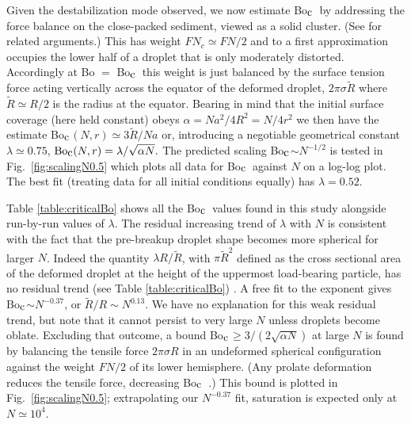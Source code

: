 \documentclass[aps,prl,superscriptaddress,twocolumn,showpacs,floatfix]{revtex4-1}
\newcommand{\Boc}{Bo$_{\hbox{\rm c}}$~}
\newcommand{\Bocm}{Bo$_{\hbox{\rm c}}$}
\begin{document}
Given the destabilization mode observed, we now estimate \Boc by addressing the force balance on the close-packed sediment, viewed as a solid cluster. (See \cite{Oettel,Stone} for related arguments.) This has weight $FN_c\simeq FN/2$ and to a first approximation occupies the lower half of a droplet that is only moderately distorted. Accordingly at Bo $=$ \Boc this weight is just balanced by the surface tension force acting vertically across the equator of the deformed droplet, $2\pi\sigma \tilde R$ where $\tilde R \simeq R/2$ is the radius at the equator. Bearing in mind that the initial surface coverage (here held constant) obeys $\alpha = Na^2/4R^2 = N/4r^2$ we then have the estimate \Bocm $(N,r) \simeq 3\tilde R/Na$ or, introducing a negotiable geometrical constant $\lambda \simeq 0.75$,
$
{\rm Bo}_{\hbox{\rm c}}(N,r)  = {\lambda}/{\sqrt{\alpha N}}.
$
The predicted scaling \Bocm $\sim N^{-1/2}$ is tested in Fig.~\ref{fig:scalingN0.5} which plots all data for \Boc against $N$ on a log-log plot. The best fit (treating data for all initial conditions equally)  has $\lambda = 0.52$. 

Table \ref{table:criticalBo} shows all the \Boc values found in this study alongside run-by-run values of $\lambda$. The residual increasing trend of $\lambda$ with $N$ is consistent with the fact that the pre-breakup droplet shape becomes more spherical for larger $N$. Indeed the quantity $\lambda R/\tilde R$, with $\pi\tilde R^2$ defined as the cross sectional area of the deformed droplet at the height of the uppermost load-bearing particle, has no residual trend (see Table \ref{table:criticalBo})  \cite{Footnote}. A free fit to the exponent gives \Bocm $\sim N^{-0.37}$, or $\tilde R/R\sim N^{0.13}$. We have no explanation for this weak residual trend, but note that it cannot persist to very large $N$ unless droplets become oblate. Excluding that outcome, a bound \Bocm $\ge 3/(2\sqrt{\alpha N})$ at large $N$ is found by balancing the tensile force $2\pi\sigma R$ in an undeformed spherical configuration against the weight $FN/2$ of its lower hemisphere. (Any prolate deformation reduces the tensile force, decreasing \Boc.) This bound is plotted in Fig.~\ref{fig:scalingN0.5}; extrapolating our $N^{-0.37}$ fit, saturation is expected only at $N\simeq 10^4$. 
 
\end{document}
